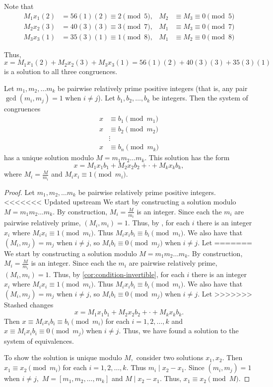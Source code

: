 \documentclass{ximera}
\begin{document}
\begin{example}
    Note that 
    \begin{align*}
        M_1x_1(2)&=56(1)(2)\equiv 2\pmod 5, & M_2&\equiv M_3\equiv 0\pmod{5}\\
        M_2x_2(3)&=40(3)(3)\equiv 3\pmod 7, & M_1&\equiv M_3\equiv 0\pmod{7}\\
        M_3x_3(1)&=35(3)(1)\equiv 1\pmod 8, & M_1&\equiv M_2\equiv 0\pmod{8}
    \end{align*}

    Thus, \[x=M_1x_1(2)+M_2x_2(3)+M_3x_3(1)=56(1)(2)+40(3)(3)+35(3)(1)\]
    is a solution to all three congruences.
\end{example}

\begin{theorem}\label{CRT}
    Let $m_1,m_2,\dots m_k$ be pairwise relatively prime positive integers (that is, any pair $\gcd(m_i,m_j)=1$ when $i\neq j$). Let $b_1, b_2,\dots, b_k$ be integers. Then the system of congruences 
   \begin{align*}
    x&\equiv b_1 \pmod{m_1}\\
    x&\equiv b_2 \pmod{m_2}\\
       &\vdots\\
     x&\equiv b_n \pmod{m_k}
   \end{align*}
   has a unique solution modulo $M=m_1m_2\dots m_k$. This solution has the form 
   \[x=M_1x_1b_1+M_2x_2b_2+\cdot+M_kx_kb_k,\] where $M_i=\frac{M}{m_i}$ and $M_i x_i\equiv 1 \pmod{m_i}$.
   
   \begin{proof} Let $m_1,m_2,\dots m_k$ be pairwise relatively prime positive integers.
<<<<<<< Updated upstream
    We start by constructing a solution modulo $M=m_1m_2\dots m_k$. By construction, $M_i=\frac{M}{m_i}$ is an integer. Since each the $m_i$ are pairwise relatively prime, $\left(M_i, m_i\right)=1$. Thus, by , for each $i$ there is an integer $x_i$ where $M_i x_i\equiv 1 \pmod{m_i}$. Thus $M_i x_i b_i\equiv b_i\pmod{m_i}$. We also have that $(M_i, m_j)=m_j$ when $i\neq j$, so $M_i b_i\equiv 0 \pmod{m_j}$ when $i\neq j$.  Let 
=======
    We start by constructing a solution modulo $M=m_1m_2\dots m_k$. By construction, $M_i=\frac{M}{m_i}$ is an integer. Since each the $m_i$ are pairwise relatively prime, $\left(M_i, m_i\right)=1$. Thus, by \cref{cor:condition-invertible}, for each $i$ there is an integer $x_i$ where $M_i x_i\equiv 1 \pmod{m_i}$. Thus $M_i x_i b_i\equiv b_i\pmod{m_i}$. We also have that $(M_i, m_j)=m_j$ when $i\neq j$, so $M_i b_i\equiv 0 \pmod{m_j}$ when $i\neq j$.  Let 
>>>>>>> Stashed changes
    \[x=M_1x_1b_1+M_2x_2b_2+\cdot+M_kx_kb_k.\] 
    Then $x\equiv M_i x_i b_i\equiv b_i\pmod{m_i}$ for each $i=1,2,\dots,k$ and $x\equiv M_i x_i b_i\equiv 0\pmod{m_j}$ when $i\neq j.$ Thus, we have found a solution to the system of equivalences.
    
    To show the solution is unique modulo $M,$ consider two solutions $x_1,x_2.$ Then $x_1\equiv x_2\pmod{m_i}$ for each $i=1,2,\dots,k.$ Thus $m_i\mid x_2-x_1$. Since $(m_i,m_j)=1$ when $i\neq j,$ $M=[m_1,m_2,\dots,m_k]$ and $M\mid x_2-x_1.$ Thus, $x_1\equiv x_2\pmod M.$ 
   \end{proof}
\end{theorem}  

\end{document}
